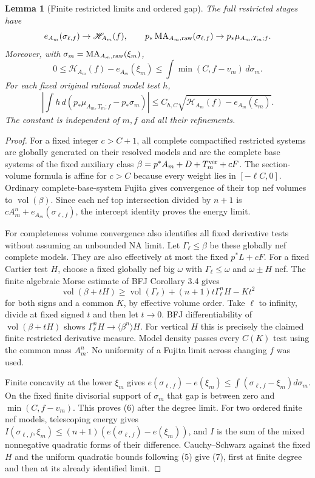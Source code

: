 \documentclass[11pt]{article}
\newtheorem{lemma}[theorem]{Lemma}
\newcommand{\MA}{\operatorname{MA}}
\newcommand{\vol}{\operatorname{vol}}
\begin{document}
\begin{lemma}[Finite restricted limits and ordered gap]\label{restricted}
The full restricted stages have
\[
 e_{A_m}(\sigma_{\ell,f})\to\mathscr H_{A_m}(f),\qquad
 p_*\MA_{A_m,\rm raw}(\sigma_{\ell,f})
                   \to p_*\mu_{A_m,T_m;f}.
\]
Moreover, with $\sigma_m=\MA_{A_m,\rm raw}(\xi_m)$,
\[
 0\leq\mathscr H_{A_m}(f)-e_{A_m}(\xi_m)
 \leq\int\min(C,f-v_m)\,d\sigma_m.                     \tag{6}
\]
For each fixed original rational model test $h$,
\[
 \left|\int h\,d(p_*\mu_{A_m,T_m;f}-p_*\sigma_m)\right|
 \leq C_{h,C}\sqrt{\mathscr H_{A_m}(f)-e_{A_m}(\xi_m)}. \tag{7}
\]
The constant is independent of $m,f$ and all their refinements.
\end{lemma}
\begin{proof}
For a fixed integer $c>C+1$, all complete compactified restricted
systems are globally generated on their resolved models and are
the complete base systems of the fixed auxiliary class
$\beta=p^*A_m+D+T_m^{\rm ver}+cF$.
The section-volume formula is affine for $c>C$ because every
weight lies in $[-\ell C,0]$.
Ordinary complete-base-system Fujita gives convergence of their
top nef volumes to $\vol(\beta)$.
Since each nef top intersection divided by $n+1$ is
$cA_m^n+e_{A_m}(\sigma_{\ell,f})$,
the intercept identity proves the energy limit.

For completeness volume convergence also identifies all fixed
derivative tests without assuming an unbounded NA limit.
Let $\Gamma_\ell\leq\beta$ be these globally nef complete models.
They are also effectively at most the fixed $p^*L+cF$.
For a fixed Cartier test $H$, choose a fixed globally nef big
$\omega$ with $\Gamma_\ell\leq\omega$ and $\omega\pm H$ nef.
The finite algebraic Morse estimate of BFJ Corollary 3.4 gives
\[
 \vol(\beta+tH)\geq
 \vol(\Gamma_\ell)+(n+1)t\Gamma_\ell^nH-Kt^2
\]
for both signs and a common $K$, by effective volume order.
Take $\ell$ to infinity, divide at fixed signed $t$ and then
let $t\to0$.
BFJ differentiability of $\vol(\beta+tH)$ shows
$\Gamma_\ell^nH\to\langle\beta^n\rangle H$.
For vertical $H$ this is precisely the claimed finite
restricted derivative measure. Model density passes every $C(K)$
test using the common mass $A_m^n$.
No uniformity of a Fujita limit across changing $f$ was used.

Finite concavity at the lower $\xi_m$ gives
$e(\sigma_{\ell,f})-e(\xi_m)
\leq\int(\sigma_{\ell,f}-\xi_m)d\sigma_m$.
On the fixed finite divisorial support of $\sigma_m$ that gap is
between zero and $\min(C,f-v_m)$.
This proves (6) after the degree limit.
For two ordered finite nef models, telescoping energy gives
$I(\sigma_{\ell,f},\xi_m)\leq
(n+1)(e(\sigma_{\ell,f})-e(\xi_m))$,
and $I$ is the sum of the mixed nonnegative quadratic forms of
their difference. Cauchy--Schwarz against the fixed $H$ and the
uniform quadratic bounds following (5) give (7), first at finite
degree and then at its already identified limit.
\end{proof}
\end{document}
